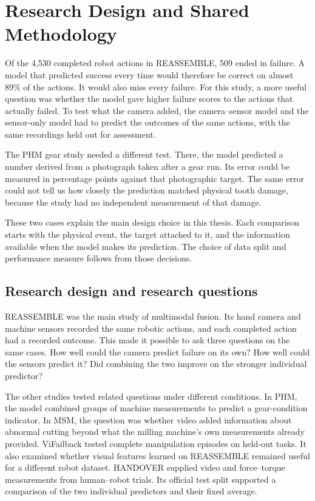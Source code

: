 \chapter{Research Design and Shared Methodology}
\label{ch:methodology}

Of the 4,530 completed robot actions in REASSEMBLE, 509 ended in failure. A model that predicted success every time would therefore be correct on almost 89\% of the actions. It would also miss every failure. For this study, a more useful question was whether the model gave higher failure scores to the actions that actually failed. To test what the camera added, the camera–sensor model and the sensor-only model had to predict the outcomes of the same actions, with the same recordings held out for assessment.

The PHM gear study needed a different test. There, the model predicted a number derived from a photograph taken after a gear run. Its error could be measured in percentage points against that photographic target. The same error could not tell us how closely the prediction matched physical tooth damage, because the study had no independent measurement of that damage.

These two cases explain the main design choice in this thesis. Each comparison starts with the physical event, the target attached to it, and the information available when the model makes its prediction. The choice of data split and performance measure follows from those decisions.

\section{Research design and research questions}
\label{sec:ch4-design}

REASSEMBLE was the main study of multimodal fusion. Its hand camera and machine sensors recorded the same robotic actions, and each completed action had a recorded outcome. This made it possible to ask three questions on the same cases. How well could the camera predict failure on its own? How well could the sensors predict it? Did combining the two improve on the stronger individual predictor?

The other studies tested related questions under different conditions. In PHM, the model combined groups of machine measurements to predict a gear-condition indicator. In MSM, the question was whether video added information about abnormal cutting beyond what the milling machine’s own measurements already provided. ViFailback tested complete manipulation episodes on held-out tasks. It also examined whether visual features learned on REASSEMBLE remained useful for a different robot dataset. HANDOVER supplied video and force–torque measurements from human–robot trials. Its official test split supported a comparison of the two individual predictors and their fixed average.

